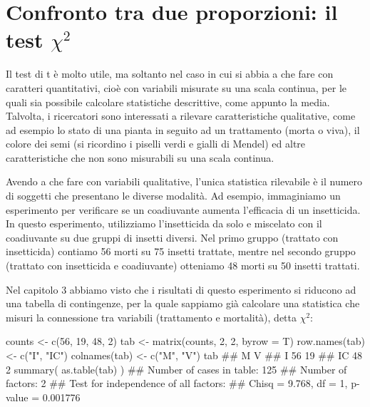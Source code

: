 \documentclass[a4paper,12pt,oneside]{book}
\newenvironment{Shaded}{\begin{snugshade}}{\end{snugshade}}
\newcommand{\DecValTok}[1]{#1}
\newcommand{\StringTok}[1]{#1}
\newcommand{\DocumentationTok}[1]{#1}
\newcommand{\OtherTok}[1]{#1}
\newcommand{\FunctionTok}[1]{#1}
\newcommand{\AttributeTok}[1]{#1}
\newcommand{\NormalTok}[1]{#1}
\begin{document}
\hypertarget{confronto-tra-due-proporzioni-il-test-chi2}{%
\section{\texorpdfstring{Confronto tra due proporzioni: il test \(\chi^2\)}{Confronto tra due proporzioni: il test \textbackslash chi\^{}2}}\label{confronto-tra-due-proporzioni-il-test-chi2}}

Il test di t è molto utile, ma soltanto nel caso in cui si abbia a che fare con caratteri quantitativi, cioè con variabili misurate su una scala continua, per le quali sia possibile calcolare statistiche descrittive, come appunto la media. Talvolta, i ricercatori sono interessati a rilevare caratteristiche qualitative, come ad esempio lo stato di una pianta in seguito ad un trattamento (morta o viva), il colore dei semi (si ricordino i piselli verdi e gialli di Mendel) ed altre caratteristiche che non sono misurabili su una scala continua.

Avendo a che fare con variabili qualitative, l'unica statistica rilevabile è il numero di soggetti che presentano le diverse modalità. Ad esempio, immaginiamo un esperimento per verificare se un coadiuvante aumenta l'efficacia di un insetticida. In questo esperimento, utilizziamo l'insetticida da solo e miscelato con il coadiuvante su due gruppi di insetti diversi. Nel primo gruppo (trattato con insetticida) contiamo 56 morti su 75 insetti trattate, mentre nel secondo gruppo (trattato con insetticida e coadiuvante) otteniamo 48 morti su 50 insetti trattati.

Nel capitolo 3 abbiamo visto che i risultati di questo esperimento si riducono ad una tabella di contingenze, per la quale sappiamo già calcolare una statistica che misuri la connessione tra variabili (trattamento e mortalità), detta \(\chi^2\):

\begin{Shaded}
\begin{Highlighting}[]
\NormalTok{counts }\OtherTok{\textless{}{-}} \FunctionTok{c}\NormalTok{(}\DecValTok{56}\NormalTok{, }\DecValTok{19}\NormalTok{, }\DecValTok{48}\NormalTok{, }\DecValTok{2}\NormalTok{)}
\NormalTok{tab }\OtherTok{\textless{}{-}} \FunctionTok{matrix}\NormalTok{(counts, }\DecValTok{2}\NormalTok{, }\DecValTok{2}\NormalTok{, }\AttributeTok{byrow =}\NormalTok{ T)}
\FunctionTok{row.names}\NormalTok{(tab) }\OtherTok{\textless{}{-}} \FunctionTok{c}\NormalTok{(}\StringTok{"I"}\NormalTok{, }\StringTok{"IC"}\NormalTok{)}
\FunctionTok{colnames}\NormalTok{(tab) }\OtherTok{\textless{}{-}} \FunctionTok{c}\NormalTok{(}\StringTok{"M"}\NormalTok{, }\StringTok{"V"}\NormalTok{)}
\NormalTok{tab}
\DocumentationTok{\#\#     M  V}
\DocumentationTok{\#\# I  56 19}
\DocumentationTok{\#\# IC 48  2}
\FunctionTok{summary}\NormalTok{( }\FunctionTok{as.table}\NormalTok{(tab) )}
\DocumentationTok{\#\# Number of cases in table: 125 }
\DocumentationTok{\#\# Number of factors: 2 }
\DocumentationTok{\#\# Test for independence of all factors:}
\DocumentationTok{\#\#  Chisq = 9.768, df = 1, p{-}value = 0.001776}
\end{Highlighting}
\end{Shaded}
\end{document}
